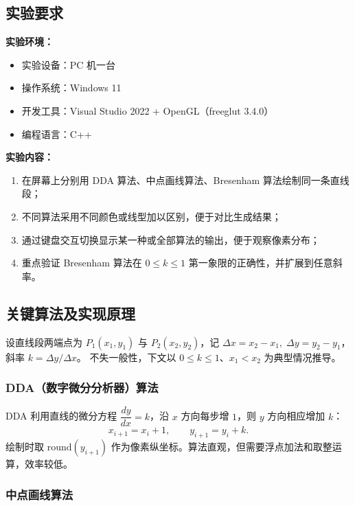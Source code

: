 \documentclass[a4paper,12pt]{ctexart}
\begin{document}
\subsection{实验要求}

\textbf{实验环境：}
\begin{itemize}[leftmargin=2em,itemsep=0.2em]
    \item 实验设备：PC 机一台
    \item 操作系统：Windows 11
    \item 开发工具：Visual Studio 2022 + OpenGL（freeglut 3.4.0）
    \item 编程语言：C++
\end{itemize}

\textbf{实验内容：}
\begin{enumerate}[leftmargin=2em,itemsep=0.2em]
    \item 在屏幕上分别用 DDA 算法、中点画线算法、Bresenham 算法绘制同一条直线段；
    \item 不同算法采用不同颜色或线型加以区别，便于对比生成结果；
    \item 通过键盘交互切换显示某一种或全部算法的输出，便于观察像素分布；
    \item 重点验证 Bresenham 算法在 $0 \le k \le 1$ 第一象限的正确性，并扩展到任意斜率。
\end{enumerate}

\subsection{关键算法及实现原理}

设直线段两端点为 $P_1(x_1,y_1)$ 与 $P_2(x_2,y_2)$，记
$\Delta x = x_2-x_1,\;\Delta y = y_2-y_1$，斜率 $k = \Delta y / \Delta x$。
不失一般性，下文以 $0 \le k \le 1$、$x_1 < x_2$ 为典型情况推导。

\subsubsection{DDA（数字微分分析器）算法}

DDA 利用直线的微分方程
$\dfrac{dy}{dx}=k$，沿 $x$ 方向每步增 $1$，则 $y$ 方向相应增加 $k$：
\[
    x_{i+1}=x_i+1,\qquad y_{i+1}=y_i+k.
\]
绘制时取 $\mathrm{round}(y_{i+1})$ 作为像素纵坐标。算法直观，但需要浮点加法和取整运算，效率较低。

\subsubsection{中点画线算法}
\end{document}
